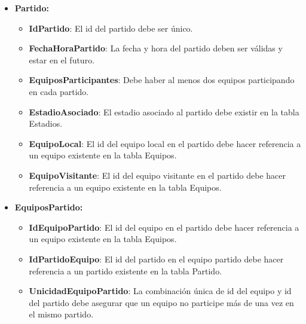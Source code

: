 \begin{itemize}
    \item \textbf{Partido:}
        \begin{itemize}
            \item \textbf{IdPartido}: El id del partido debe ser único.
            \item \textbf{FechaHoraPartido}: La fecha y hora del partido deben ser válidas y estar en el futuro.
            \item \textbf{EquiposParticipantes}: Debe haber al menos dos equipos participando en cada partido.
            \item \textbf{EstadioAsociado}: El estadio asociado al partido debe existir en la tabla Estadios.
            \item \textbf{EquipoLocal}: El id del equipo local en el partido debe hacer referencia a un equipo existente en la tabla Equipos.
            \item \textbf{EquipoVisitante}: El id del equipo visitante en el partido debe hacer referencia a un equipo existente en la tabla Equipos.
        \end{itemize}

    \item \textbf{EquiposPartido:}
    \begin{itemize}
        \item \textbf{IdEquipoPartido}: El id del equipo en el partido debe hacer referencia a un equipo existente en la tabla Equipos.
        \item \textbf{IdPartidoEquipo}: El id del partido en el equipo partido debe hacer referencia a un partido existente en la tabla Partido.
        \item \textbf{UnicidadEquipoPartido}: La combinación única de id del equipo y id del partido debe asegurar que un equipo no participe más de una vez en el mismo partido.
    \end{itemize}
\end{itemize}